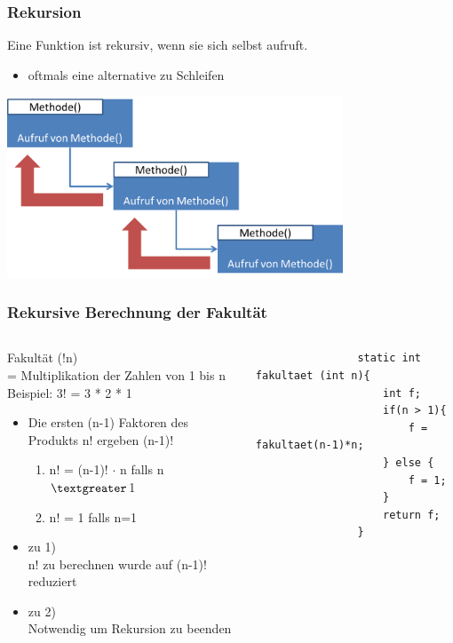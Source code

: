 \begin{frame}[fragile]
	  \frametitle{Rekursion}
	  \small
	  Eine Funktion ist rekursiv, wenn sie sich selbst aufruft.
	  \begin{itemize}
	    \item oftmals eine alternative zu Schleifen
	  \end{itemize}
	  \begin{center}
	  \includegraphics[width=0.75\textwidth,
	  keepaspectratio=true]{bilder/rekursion.png}
	  \end{center}
\end{frame}

\begin{frame}[fragile] 
	  \frametitle{Rekursive Berechnung der Fakultät}
		 \begin{columns}
		 \begin{column}{0.6\textwidth}
			  \small
			  Fakultät (!n) \\= Multiplikation der Zahlen von 1 bis n\\
			  Beispiel: 3! = 3 * 2 * 1
			  \begin{itemize}
			  	\item Die ersten (n-1) Faktoren des Produkts n! ergeben (n-1)!
			  	\begin{enumerate}
			  	  \item n! = (n-1)! $\cdot$ n falls n$\textgreater$1
			  	  \item n! = 1 falls n=1
			  	\end{enumerate}
			  	\item zu 1) \\n! zu berechnen wurde auf (n-1)! reduziert
			  	\item zu 2) \\Notwendig um Rekursion zu beenden
			  \end{itemize}
		 \end{column}
		 \begin{column}{0.4\textwidth}
		 	\begin{lstlisting}
		 		static int fakultaet (int n){
		 			int f;
		 			if(n > 1){
		 				f = fakultaet(n-1)*n;
		 			} else {
		 				f = 1;
		 			}
		 			return f;
		 		}
		 	\end{lstlisting}
		 \end{column}
		 \end{columns}
\end{frame}

